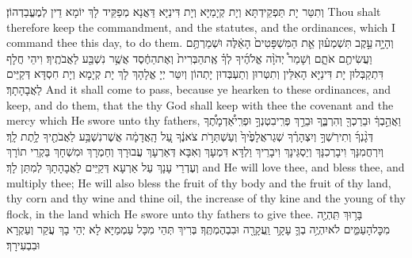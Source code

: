 {וְתִטַּר יָת תַּפְקֵידְתָּא וְיָת קְיָמַיָּא וְיָת דִּינַיָּא דַּאֲנָא מְפַקֵּיד לָךְ יוֹמָא דֵין לְמֶעֱבַדְהוֹן׃}
{Thou shalt therefore keep the commandment, and the statutes, and the ordinances, which I command thee this day, to do them.}{}
\newseder
{}%
{וְהָיָ֣ה \legarmeh  עֵ֣קֶב תִּשְׁמְע֗וּן אֵ֤ת הַמִּשְׁפָּטִים֙ הָאֵ֔לֶּה וּשְׁמַרְתֶּ֥ם וַעֲשִׂיתֶ֖ם אֹתָ֑ם וְשָׁמַר֩ יְהֹוָ֨ה אֱלֹהֶ֜יךָ לְךָ֗ אֶֽת\maqqaf הַבְּרִית֙ וְאֶת\maqqaf הַחֶ֔סֶד אֲשֶׁ֥ר נִשְׁבַּ֖ע לַאֲבֹתֶֽיךָ׃}
{וִיהֵי חֲלָף דִּתְקַבְּלוּן יָת דִּינַיָּא הָאִלֵּין וְתִטְּרוּן וְתַעְבְּדוּן יָתְהוֹן וְיִטַּר יְיָ אֱלָהָךְ לָךְ יָת קְיָמָא וְיָת חִסְדָּא דְּקַיֵּים לַאֲבָהָתָךְ׃}
{And it shall come to pass, because ye hearken to these ordinances, and keep, and do them, that the \lord\space thy God shall keep with thee the covenant and the mercy which He swore unto thy fathers,}{}
{וַאֲהֵ֣בְךָ֔ וּבֵרַכְךָ֖ וְהִרְבֶּ֑ךָ וּבֵרַ֣ךְ פְּרִֽי\maqqaf בִטְנְךָ֣ וּפְרִֽי\maqqaf אַ֠דְמָתֶ֠ךָ דְּגָ֨נְךָ֜ וְתִירֹֽשְׁךָ֣ וְיִצְהָרֶ֗ךָ שְׁגַר\maqqaf אֲלָפֶ֙יךָ֙ וְעַשְׁתְּרֹ֣ת צֹאנֶ֔ךָ עַ֚ל הָֽאֲדָמָ֔ה אֲשֶׁר\maqqaf נִשְׁבַּ֥ע לַאֲבֹתֶ֖יךָ לָ֥תֶת לָֽךְ׃}
{וְיִרְחֲמִנָּךְ וִיבָרְכִנָּךְ וְיַסְגֵּינָךְ וִיבָרֵיךְ וַלְדָּא דִּמְעָךְ וְאִבָּא דְּאַרְעָךְ עֲבוּרָךְ וְחַמְרָךְ וּמִשְׁחָךְ בַּקְרֵי תוֹרָךְ וְעֶדְרֵי עָנָךְ עַל אַרְעָא דְּקַיֵּים לַאֲבָהָתָךְ לְמִתַּן לָךְ׃}
{and He will love thee, and bless thee, and multiply thee; He will also bless the fruit of thy body and the fruit of thy land, thy corn and thy wine and thine oil, the increase of thy kine and the young of thy flock, in the land which He swore unto thy fathers to give thee.}{}
{בָּר֥וּךְ תִּֽהְיֶ֖ה מִכׇּל\maqqaf הָעַמִּ֑ים לֹא\maqqaf יִהְיֶ֥ה בְךָ֛ עָקָ֥ר וַֽעֲקָרָ֖ה וּבִבְהֶמְתֶּֽךָ׃}
{בְּרִיךְ תְּהֵי מִכָּל עַמְמַיָּא לָא יְהֵי בָךְ עֲקַר וְעַקְרָא וּבִבְעִירָךְ׃}
